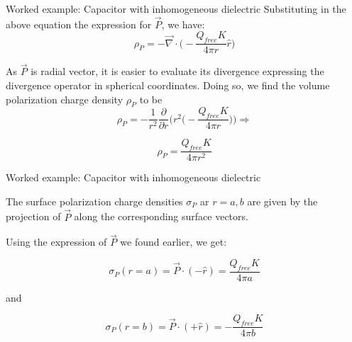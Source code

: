 {\begin{frame}{Worked example: Capacitor with inhomogeneous dielectric}
  Substituting in the above equation the expression for $\vec{P}$, we have:
  \begin{equation*}
     \rho_{P} = - \vec{\nabla} \cdot \Big( - \frac{Q_{free}K}{4\pi r} \hat{r} \Big)
  \end{equation*}

  As $\vec{P}$ is radial vector, it is easier to evaluate its divergence
  expressing the divergence operator in spherical coordinates.
  Doing so, we find the volume polarization charge density $\rho_{P}$ to be
  \begin{equation*}
     \rho_{P} = - \frac{1}{r^2} \frac{\partial}{\partial r}
                  \Bigg(r^2
                    \Big( - \frac{Q_{free}K}{4\pi r} \Big)
                  \Bigg) \Rightarrow
  \end{equation*}

  \begin{equation*}
     \rho_{P} = \frac{Q_{free}K}{4\pi r^2}
  \end{equation*}

\end{frame}
%
%
%

\begin{frame}{Worked example: Capacitor with inhomogeneous dielectric}

  The surface polarization charge densities $\sigma_{P}$
  ar $r=a,b$ are given by the projection of $\vec{P}$
  along the corresponding surface vectors.

  Using the expression of $\vec{P}$ we found earlier, we get:

  \begin{equation*}
     \sigma_{P}(r=a) = \vec{P} \cdot (-\hat{r}) = \frac{Q_{free}K}{4\pi a}
  \end{equation*}

  and

  \begin{equation*}
     \sigma_{P}(r=b) = \vec{P} \cdot (+\hat{r}) = - \frac{Q_{free}K}{4\pi b}
  \end{equation*}

\end{frame}


} %

